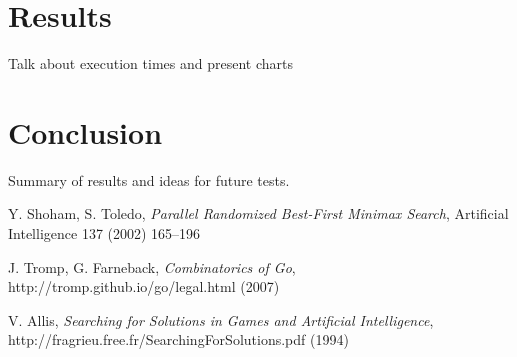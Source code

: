 \documentclass[conference]{IEEEtran}
\begin{document}
\section{Results}
Talk about execution times and present charts

\section{Conclusion}
Summary of results and ideas for future tests.

\begin{thebibliography}{3}

Y. Shoham, S. Toledo, \emph{Parallel Randomized Best-First Minimax Search},  Artificial Intelligence 137 (2002) 165--196

J. Tromp, G. Farneback, \emph{Combinatorics of Go},
http://tromp.github.io/go/legal.html (2007)

V. Allis, \emph{Searching for Solutions in Games and Artificial Intelligence},
http://fragrieu.free.fr/SearchingForSolutions.pdf (1994)

\end{thebibliography}
\end{document}

